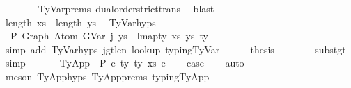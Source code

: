 \begin{isabellebody}
\ \ \ \ \ \ \isamarkupfalse%
\ TyVar{\isachardot}{\kern0pt}prems{\isacharparenleft}{\kern0pt}{}{\isacharparenright}{\kern0pt}\ dual{\isacharunderscore}{\kern0pt}order{\isachardot}{\kern0pt}strict{\isacharunderscore}{\kern0pt}trans{}\ \isamarkupfalse%
\ blast\isanewline
\ \ \ \ \isamarkupfalse%
\isanewline
\isanewline
\ \ \ \ \isamarkupfalse%
\ {\isachardoublequoteopen}length\ xs{\isacharprime}{\kern0pt}\ {\isacharequal}{\kern0pt}\ length\ ys{\isachardoublequoteclose}\ \isamarkupfalse%
\ TyVar{\isachardot}{\kern0pt}hyps{\isacharparenleft}{\kern0pt}{}{\isacharparenright}{\kern0pt}\ \isakeywordONE{{\isachardot}{\kern0pt}}\isamarkupfalse%
\isanewline
\ \ \ \ \isamarkupfalse%
\ \isamarkupfalse%
\ {\isachardoublequoteopen}{\isasymGamma}{}\ {\isasymturnstile}{\isacharbraceleft}{\kern0pt}P{\isacharbraceright}{\kern0pt}\ Graph\ {\isacharparenleft}{\kern0pt}Atom\ {\isacharparenleft}{\kern0pt}GVar\ j{\isacharparenright}{\kern0pt}\ ys{\isacharparenright}{\kern0pt}\ {\isacharcolon}{\kern0pt}\ lmap{\isacharunderscore}{\kern0pt}ty\ xs{\isacharprime}{\kern0pt}\ ys\ ty{\isacharprime}{\kern0pt}{\isachardoublequoteclose}\isanewline
\ \ \ \ \ \ \isamarkupfalse%
\ {\isacharparenleft}{\kern0pt}simp\ add{\isacharcolon}{\kern0pt}\ TyVar{\isachardot}{\kern0pt}hyps{\isacharparenleft}{\kern0pt}{}{\isacharcomma}{\kern0pt}{}{\isacharcomma}{\kern0pt}{}{\isacharparenright}{\kern0pt}\ j{\isacharunderscore}{\kern0pt}gt{\isacharunderscore}{\kern0pt}len{\isacharunderscore}{\kern0pt}{\isasymGamma}{}\ lookup{}\ typing{\isachardot}{\kern0pt}TyVar{\isacharparenright}{\kern0pt}\isanewline
\isanewline
\ \ \ \ \isamarkupfalse%
\ {\isacharquery}{\kern0pt}thesis\isanewline
\ \ \ \ \ \ \isamarkupfalse%
\ subst{\isacharunderscore}{\kern0pt}gt\ \isamarkupfalse%
\ simp\isanewline
\ \ \isamarkupfalse%
\isanewline
{}\isamarkupfalse%
\isanewline
\ \ \isamarkupfalse%
\ {\isacharparenleft}{\kern0pt}TyApp\ {\isasymGamma}\ P\ e{}\ ty{}\ ty{}\ xs\ e{}{\isacharparenright}{\kern0pt}\isanewline
\ \ \isamarkupfalse%
\ {\isacharquery}{\kern0pt}case\isanewline
\ \ \isamarkupfalse%
\ auto\isanewline
\ \ \isamarkupfalse%
\ {\isacharparenleft}{\kern0pt}meson\ TyApp{\isachardot}{\kern0pt}hyps{\isacharparenleft}{\kern0pt}{}{\isacharcomma}{\kern0pt}{}{\isacharparenright}{\kern0pt}\ TyApp{\isachardot}{\kern0pt}prems{\isacharparenleft}{\kern0pt}{}{\isacharcomma}{\kern0pt}{}{\isacharcomma}{\kern0pt}{}{\isacharcomma}{\kern0pt}{}{\isacharcomma}{\kern0pt}{}{\isacharparenright}{\kern0pt}\ typing{\isachardot}{\kern0pt}TyApp{\isacharparenright}{\kern0pt}\isanewline

\end{isabellebody}
